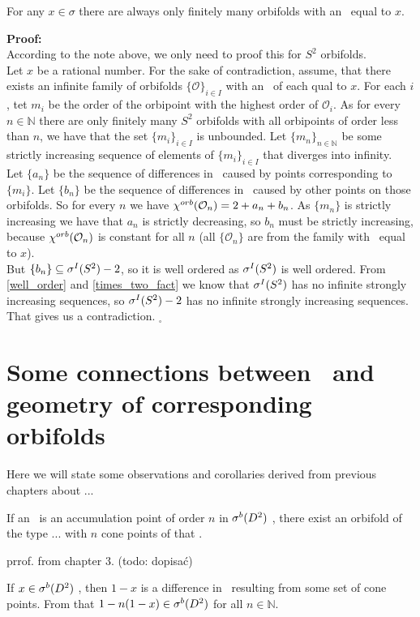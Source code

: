 \begin{theorem}
For any $x \in \sigma$ there are always only finitely many orbifolds 
with an \Eoc\ equal to $x$.
\end{theorem}
\textbf{Proof:} \\
According to the note above, we only need to proof this for $S^2$ orbifolds. \\ 
Let $x$ be a rational number. 
For the sake of contradiction, assume, that there exists an infinite family of orbifolds 
$\{\mathcal{O}\}_{i \in I}$ with an \Eoc\ of each qual to $x$. For each $i$, tet $m_i$ be the 
order of the orbipoint with the highest order of $\mathcal{O}_i$. As for every $n \in \mathbb{N}$ 
there are only finitely many $S^2$ orbifolds with all orbipoints of order less than $n$, we have 
that the set $\{m_i\}_{i \in I}$ is unbounded. Let $\{m_n\}_{n\in \mathbb{N}}$ be some strictly 
increasing sequence 
of elements of $\{m_i\}_{i \in I}$ that diverges into infinity. \\
Let $\{a_n\}$ be the sequence of differences in \Eoc\ caused by points corresponding to $\{m_i\}$. 
Let $\{b_n\}$ be the sequence of differences in \Eoc\ caused by other points on those orbifolds. 
So for every $n$ we have ${\chi^{orb}(\mathcal{O}_n)} = 2 + a_n + b_n$. As $\{m_n\}$ is strictly 
increasing we have that $a_n$ is strictly decreasing, so $b_n$ must be strictly 
increasing, because ${\chi^{orb}(\mathcal{O}_n)}$ is constant for all $n$ (all $\{\mathcal{O}_n\}$ 
are from the family with \Eoc\ equal to $x$). \\ 
But $\{b_n\} \subseteq {\mathcal{\sigma}^I(S^2)} - 2$, so it is well ordered as $\sIS$ is well ordered. 
From \ref{well_order} and \ref{times_two_fact} we know that $\sIS$ has no infinite 
strongly increasing sequences, so 
${\mathcal{\sigma}^I(S^2)} - 2$ has no infinite strongly increasing sequences. That gives us a contradiction. 
\Lightning $_\square$ 
 
\section{Some connections between \Eoc\ and geometry of corresponding orbifolds}
Here we will state some observations and corollaries derived from previous chapters 
about ... 
\begin{observation}
If an \Eoc\ is an accumulation point of order $n$ in ${\mathcal{\sigma}^b(D^2)}$ \dsa{$\sIS$}, there exist an 
orbifold of the type ... \dsa{} with $n$ cone  points of that \Eoc. 
\end{observation}
prrof. from chapter 3. (todo: dopisać)
\begin{observation}\label{adding_multiplied_differences}
If $x \in {\mathcal{\sigma}^b(D^2)}$ \dsa{$\sIS$}, then $1-x$  is a difference in \Eoc\ resulting 
from some set of cone  points. From that $1-n(1-x) \in {\mathcal{\sigma}^b(D^2)}$  
for all $n \in \mathbb{N}$. 
\end{observation}

